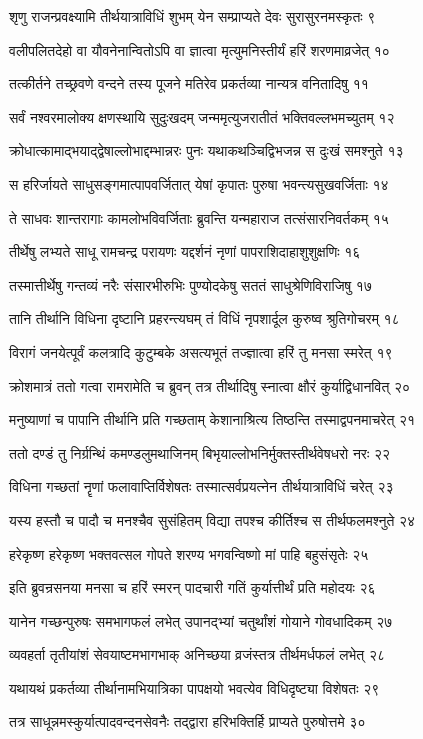 शृणु राजन्प्रवक्ष्यामि तीर्थयात्राविधिं शुभम्
येन सम्प्राप्यते देवः सुरासुरनमस्कृतः ९

वलीपलितदेहो वा यौवनेनान्वितोऽपि वा
ज्ञात्वा मृत्युमनिस्तीर्यं हरिं शरणमाव्रजेत् १०

तत्कीर्तने तच्छ्रवणे वन्दने तस्य पूजने
मतिरेव प्रकर्तव्या नान्यत्र वनितादिषु ११

सर्वं नश्वरमालोक्य क्षणस्थायि सुदुःखदम्
जन्ममृत्युजरातीतं भक्तिवल्लभमच्युतम् १२

क्रोधात्कामाद्भयाद्द्वेषाल्लोभाद्दम्भान्नरः पुनः
यथाकथञ्चिद्विभजन्न स दुःखं समश्नुते १३

स हरिर्जायते साधुसङ्गमात्पापवर्जितात्
येषां कृपातः पुरुषा भवन्त्यसुखवर्जिताः १४

ते साधवः शान्तरागाः कामलोभविवर्जिताः
ब्रुवन्ति यन्महाराज तत्संसारनिवर्तकम् १५

तीर्थेषु लभ्यते साधू रामचन्द्र परायणः
यद्दर्शनं नृणां पापराशिदाहाशुशुक्षणिः १६

तस्मात्तीर्थेषु गन्तव्यं नरैः संसारभीरुभिः
पुण्योदकेषु सततं साधुश्रेणिविराजिषु १७

तानि तीर्थानि विधिना दृष्टानि प्रहरन्त्यघम्
तं विधिं नृपशार्दूल कुरुष्व श्रुतिगोचरम् १८

विरागं जनयेत्पूर्वं कलत्रादि कुटुम्बके
असत्यभूतं तज्ज्ञात्वा हरिं तु मनसा स्मरेत् १९

क्रोशमात्रं ततो गत्वा रामरामेति च ब्रुवन्
तत्र तीर्थादिषु स्नात्वा क्षौरं कुर्याद्विधानवित् २०

मनुष्याणां च पापानि तीर्थानि प्रति गच्छताम्
केशानाश्रित्य तिष्ठन्ति तस्माद्वपनमाचरेत् २१

ततो दण्डं तु निर्ग्रन्थिं कमण्डलुमथाजिनम्
बिभृयाल्लोभनिर्मुक्तस्तीर्थवेषधरो नरः २२

विधिना गच्छतां नॄणां फलावाप्तिर्विशेषतः
तस्मात्सर्वप्रयत्नेन तीर्थयात्राविधिं चरेत् २३

यस्य हस्तौ च पादौ च मनश्चैव सुसंहितम्
विद्या तपश्च कीर्तिश्च स तीर्थफलमश्नुते २४

हरेकृष्ण हरेकृष्ण भक्तवत्सल गोपते
शरण्य भगवन्विष्णो मां पाहि बहुसंसृतेः २५

इति ब्रुवन्रसनया मनसा च हरिं स्मरन्
पादचारी गतिं कुर्यात्तीर्थं प्रति महोदयः २६

यानेन गच्छन्पुरुषः समभागफलं लभेत्
उपानद्भ्यां चतुर्थांशं गोयाने गोवधादिकम् २७

व्यवहर्ता तृतीयांशं सेवयाष्टमभागभाक्
अनिच्छया व्रजंस्तत्र तीर्थमर्धफलं लभेत् २८

यथायथं प्रकर्तव्या तीर्थानामभियात्रिका
पापक्षयो भवत्येव विधिदृष्ट्या विशेषतः २९

तत्र साधून्नमस्कुर्यात्पादवन्दनसेवनैः
तद्द्वारा हरिभक्तिर्हि प्राप्यते पुरुषोत्तमे ३०

